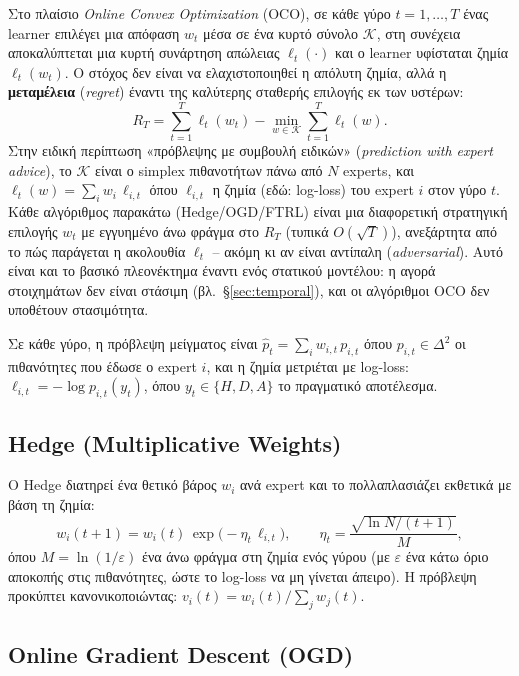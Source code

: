 \documentclass[11pt,a4paper]{article}
\renewcommand{\_}{\oldunderscore\allowbreak}
\begin{document}
Στο πλαίσιο \emph{Online Convex Optimization} (OCO), σε κάθε γύρο $t=1,\dots,T$ ένας
learner επιλέγει μια απόφαση $w_t$ μέσα σε ένα κυρτό σύνολο $\mathcal{K}$, στη συνέχεια
αποκαλύπτεται μια κυρτή συνάρτηση απώλειας $\ell_t(\cdot)$ και ο learner υφίσταται ζημία
$\ell_t(w_t)$. Ο στόχος δεν είναι να ελαχιστοποιηθεί η απόλυτη ζημία, αλλά η
\textbf{μεταμέλεια} (\emph{regret}) έναντι της καλύτερης σταθερής επιλογής εκ των υστέρων:
\begin{equation}
  R_T = \sum_{t=1}^T \ell_t(w_t) - \min_{w\in\mathcal{K}} \sum_{t=1}^T \ell_t(w).
\end{equation}
Στην ειδική περίπτωση «πρόβλεψης με συμβουλή ειδικών» (\emph{prediction with expert
advice}), το $\mathcal{K}$ είναι ο simplex πιθανοτήτων πάνω από $N$ experts, και
$\ell_t(w) = \sum_i w_i \, \ell_{i,t}$ όπου $\ell_{i,t}$ η ζημία (εδώ: log-loss) του expert
$i$ στον γύρο $t$. Κάθε αλγόριθμος παρακάτω (Hedge/OGD/FTRL) είναι μια διαφορετική
στρατηγική επιλογής $w_t$ με εγγυημένο άνω φράγμα στο $R_T$ (τυπικά $O(\sqrt{T})$),
ανεξάρτητα από το πώς παράγεται η ακολουθία $\ell_t$ -- ακόμη κι αν είναι αντίπαλη
(\emph{adversarial}). Αυτό είναι και το βασικό πλεονέκτημα έναντι ενός στατικού μοντέλου: η
αγορά στοιχημάτων δεν είναι στάσιμη (βλ.~\S\ref{sec:temporal}), και οι αλγόριθμοι OCO δεν
υποθέτουν στασιμότητα.

Σε κάθε γύρο, η πρόβλεψη μείγματος είναι $\hat p_t = \sum_i w_{i,t}\, p_{i,t}$ όπου
$p_{i,t}\in\Delta^2$ οι πιθανότητες που έδωσε ο expert $i$, και η ζημία μετριέται με
log-loss: $\ell_{i,t} = -\log p_{i,t}(y_t)$, όπου $y_t\in\{H,D,A\}$ το πραγματικό
αποτέλεσμα.

\subsection{Hedge (Multiplicative Weights)}

Ο Hedge διατηρεί ένα θετικό βάρος $w_i$ ανά expert και το πολλαπλασιάζει εκθετικά με βάση
τη ζημία:
\begin{equation}
  w_i(t+1) = w_i(t)\, \exp\!\big(-\eta_t\, \ell_{i,t}\big), \qquad
  \eta_t = \frac{\sqrt{\ln N / (t+1)}}{M},
\end{equation}
όπου $M=\ln(1/\varepsilon)$ ένα άνω φράγμα στη ζημία ενός γύρου (με $\varepsilon$ ένα κάτω
όριο αποκοπής στις πιθανότητες, ώστε το log-loss να μη γίνεται άπειρο). Η πρόβλεψη
προκύπτει κανονικοποιώντας: $v_i(t) = w_i(t)/\sum_j w_j(t)$.

\subsection{Online Gradient Descent (OGD)}
\end{document}
